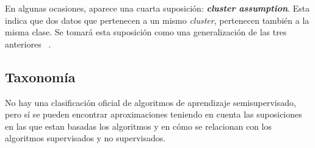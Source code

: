 En algunas ocasiones, aparece una cuarta suposición: \textit{\textbf{cluster assumption}}. Esta indica que dos datos que pertenecen a un mismo \textit{cluster}, pertenecen también a la misma clase. Se tomará esta suposición como una generalización de las tres anteriores ~\cite{Engelen:semi-supervised}.


\subsection{Taxonomía}
No hay una clasificación oficial de algoritmos de aprendizaje semisupervisado, pero sí se pueden encontrar aproximaciones teniendo en cuenta las suposiciones en las que estan basadas los algoritmos y en cómo se relacionan con los algoritmos supervisados y no supervisados.


